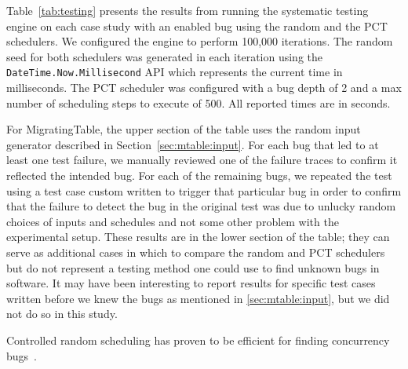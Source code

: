 Table~\ref{tab:testing} presents the results from running the \psharp systematic testing engine on each case study with an enabled bug using the random and the PCT schedulers. We configured the engine to perform 100,000 iterations. The random seed for both schedulers was generated in each iteration using the \texttt{DateTime.Now.Millisecond} API which represents the current time in milliseconds. The PCT scheduler was configured with a bug depth of 2 and a max number of scheduling steps to execute of 500. All reported times are in seconds.

For MigratingTable, the upper section of the table uses the random input generator described in Section~\ref{sec:mtable:input}.  For each bug that led to at least one test failure, we manually reviewed one of the failure traces to confirm it reflected the intended bug.  For each of the remaining bugs, we repeated the test using a test case custom written to trigger that particular bug in order to confirm that the failure to detect the bug in the original test was due to unlucky random choices of inputs and schedules and not some other problem with the experimental setup.  These results are in the lower section of the table; they can serve as additional cases in which to compare the random and PCT schedulers but do not represent a testing method one could use to find unknown bugs in software.  It may have been interesting to report results for specific test cases written before we knew the bugs as mentioned in \ref{sec:mtable:input}, but we did not do so in this study.

Controlled random scheduling has proven to be efficient for finding concurrency bugs~\cite{thomson2014sct, deligiannis2015psharp}.
